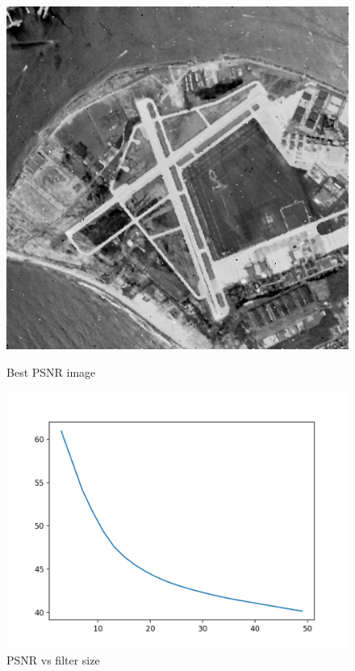\documentclass{article}
\begin{document}
    \begin{figure}[!htb]
      \includegraphics[scale=0.3]{./basic_denoising/sandiego/median_best_sp.png}
      \caption{Best PSNR image}
    \endminipage \hfill
      \includegraphics[scale=.45]{./basic_denoising/sandiego/median_psnr_sp.png}
      \caption{PSNR vs filter size}
    \endminipage
    \end{figure}
    \pagebreak
\end{document}
